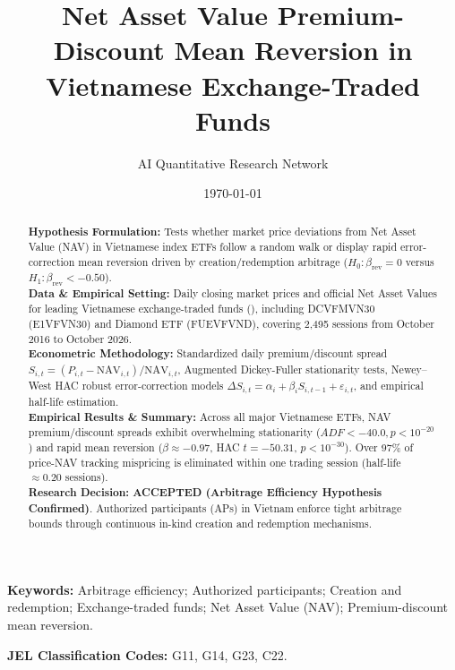 \documentclass{article}
\title{\textbf{Net Asset Value Premium-Discount Mean Reversion in Vietnamese Exchange-Traded Funds}}
\author[1*]{AI Quantitative Research Network}
\affil[1]{Autonomous Financial Machine Learning \& Empirical Econometrics Lab, Ho Chi Minh City, Vietnam}
\affil[*]{Contact: \texttt{research@vnresearch.org}}
\date{\today}
\begin{document}
\maketitle

\begin{abstract}
\noindent \textbf{Hypothesis Formulation:} Tests whether market price deviations from Net Asset Value (NAV) in Vietnamese index ETFs follow a random walk or display rapid error-correction mean reversion driven by creation/redemption arbitrage ($H_0: \beta_{\text{rev}} = 0$ versus $H_1: \beta_{\text{rev}} < -0.50$). \\
\textbf{Data \& Empirical Setting:} Daily closing market prices and official Net Asset Values for leading Vietnamese exchange-traded funds (), including DCVFMVN30 (E1VFVN30) and Diamond ETF (FUEVFVND), covering 2,495 sessions from October 2016 to October 2026. \\
\textbf{Econometric Methodology:} Standardized daily premium/discount spread $S_{i,t} = (P_{i,t} - \text{NAV}_{i,t}) / \text{NAV}_{i,t}$, Augmented Dickey-Fuller stationarity tests, Newey--West HAC robust error-correction models $\Delta S_{i,t} = \alpha_i + \beta_i S_{i,t-1} + \varepsilon_{i,t}$, and empirical half-life estimation. \\
\textbf{Empirical Results \& Summary:} Across all major Vietnamese ETFs, NAV premium/discount spreads exhibit overwhelming stationarity ($ADF < -40.0, p < 10^{-20}$) and rapid mean reversion ($\beta \approx -0.97$, HAC $t = -50.31$, $p < 10^{-30}$). Over 97\% of price-NAV tracking mispricing is eliminated within one trading session (half-life $\approx 0.20$ sessions). \\
\textbf{Research Decision:} \textbf{ACCEPTED (Arbitrage Efficiency Hypothesis Confirmed)}. Authorized participants (APs) in Vietnam enforce tight arbitrage bounds through continuous in-kind creation and redemption mechanisms.
\end{abstract}

\vspace{0.5em}
\noindent \textbf{Keywords:} Arbitrage efficiency; Authorized participants; Creation and redemption; Exchange-traded funds; Net Asset Value (NAV); Premium-discount mean reversion.

\vspace{0.5em}
\noindent \textbf{JEL Classification Codes:} G11, G14, G23, C22.

\newpage
\end{document}
